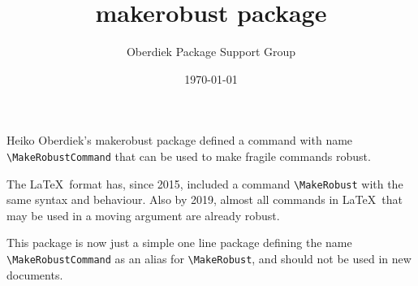 \documentclass{article}
\title{makerobust package}
\author{Oberdiek Package Support Group}
\date{\today}
\begin{document}
\maketitle

Heiko Oberdiek's \textsf{makerobust} package defined a command with name
\verb|\MakeRobustCommand| that can be used to make fragile commands
robust.

The \LaTeX\ format has, since 2015, included a command
\verb|\MakeRobust| with the same syntax and behaviour.  Also by 2019,
almost all commands in \LaTeX\ that may be used in a moving argument
are already robust.

This package is now just a simple one line package defining the name 
\verb|\MakeRobustCommand| as an alias for \verb|\MakeRobust|, and
should not be used in new documents.
\end{document}
